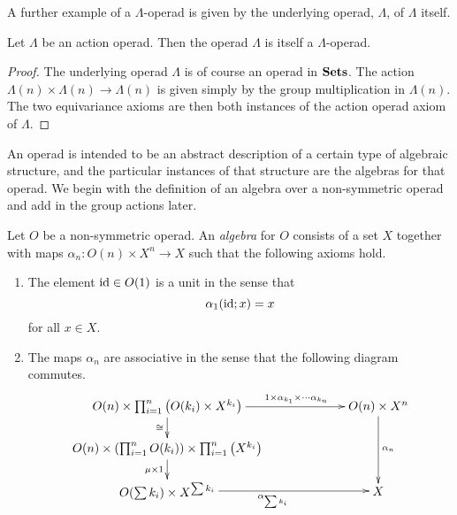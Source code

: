 A further example of a $\Lambda$-operad is given by the underlying operad, $\Lambda$, of $\Lambda$ itself.
\begin{prop}\label{gisgop}
Let $\Lambda$ be an action operad. Then the operad $\Lambda$ is itself a $\Lambda$-operad.
\end{prop}
\begin{proof}
The underlying operad $\Lambda$ is of course an operad in $\mathbf{Sets}$. The action $\Lambda(n) \times \Lambda(n) \rightarrow \Lambda(n)$ is given simply by the group multiplication in $\Lambda(n)$. The two equivariance axioms are then both instances of the action operad axiom of $\Lambda$.
\end{proof}

An operad is intended to be an abstract description of a certain type of algebraic structure, and the particular instances of that structure are the algebras for that operad. We begin with the definition of an algebra over a non-symmetric operad and add in the group actions later.

\begin{Defi}\label{opalgax}
Let $O$ be a non-symmetric operad. An \textit{algebra} for $O$ consists of a set $X$ together with maps $\alpha_{n} \colon O(n) \times X^{n} \rightarrow X$ such that the following axioms hold.
\begin{enumerate}
\item The element $\textrm{id} \in O(1)$ is a unit in the sense that
  \[
    \alpha_{1}(\textrm{id}; x) = x
  \]
for all $x \in X$.
\item The maps $\alpha_{n}$ are associative in the sense that the following diagram commutes.
  \[
    \xy
      (0,0)*+{O(n) \times \prod_{i=1}^n \left(O(k_i) \times X^{k_i}\right)}="ul";
      (60,0)*+{O(n) \times X^{n}}="ur";
      (0,-12)*+{O(n) \times \left(\prod_{i=1}^n O(k_i)\right) \times \prod_{i=1}^n \left(X^{k_i}\right) }="ml";
      (0,-24)*+{O(\sum k_{i}) \times X^{\sum k_{i}}}="bl";
      (60,-24)*+{X}="br";
      {\ar^>>>>>>>>>>>>>>{1 \times \alpha_{k_{1}} \times \cdots \alpha_{k_{n}}} "ul"; "ur"};
      {\ar^{\alpha_{n}} "ur"; "br"};
      {\ar_{\cong} "ul"; "ml"};
      {\ar_{\mu \times 1} "ml"; "bl"};
      {\ar_{\alpha_{\sum k_{i}}} "bl"; "br"};
    \endxy
  \]
\end{enumerate}
\end{Defi}


